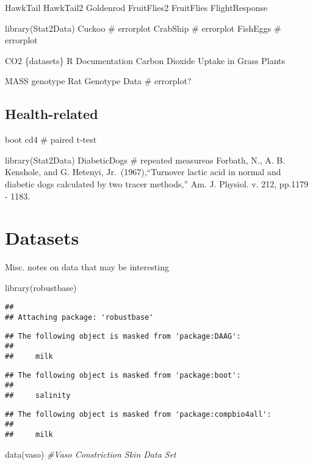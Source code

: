 \documentclass[
]{book}
\newenvironment{Shaded}{\begin{snugshade}}{\end{snugshade}}
\newcommand{\CommentTok}[1]{\textcolor[rgb]{0.56,0.35,0.01}{\textit{#1}}}
\newcommand{\FunctionTok}[1]{\textcolor[rgb]{0.00,0.00,0.00}{#1}}
\newcommand{\NormalTok}[1]{#1}
\begin{document}
HawkTail
HawkTail2
Goldenrod
FruitFlies2
FruitFlies
FlightResponse

library(Stat2Data)
Cuckoo \# errorplot
CrabShip \# errorplot
FishEggs \# errorplot

CO2 \{datasets\} R Documentation
Carbon Dioxide Uptake in Grass Plants

MASS genotype Rat Genotype Data \# errorplot?

\hypertarget{health-related}{%
\section{Health-related}\label{health-related}}

boot
cd4 \# paired t-test

library(Stat2Data)
DiabeticDogs \# repeated measureas
Forbath, N., A. B. Kenshole, and G. Hetenyi, Jr.~(1967),``Turnover lactic acid in normal and diabetic dogs calculated by two tracer methods,'' Am. J. Physiol. v. 212, pp.1179 - 1183.

\hypertarget{datasets}{%
\chapter{Datasets}\label{datasets}}

Misc. notes on data that may be interesting

\begin{Shaded}
\begin{Highlighting}[]
\FunctionTok{library}\NormalTok{(robustbase)}
\end{Highlighting}
\end{Shaded}

\begin{verbatim}
## 
## Attaching package: 'robustbase'
\end{verbatim}

\begin{verbatim}
## The following object is masked from 'package:DAAG':
## 
##     milk
\end{verbatim}

\begin{verbatim}
## The following object is masked from 'package:boot':
## 
##     salinity
\end{verbatim}

\begin{verbatim}
## The following object is masked from 'package:compbio4all':
## 
##     milk
\end{verbatim}

\begin{Shaded}
\begin{Highlighting}[]
\FunctionTok{data}\NormalTok{(vaso) }\CommentTok{\#Vaso Constriction Skin Data Set}
\end{Highlighting}
\end{Shaded}
\end{document}
